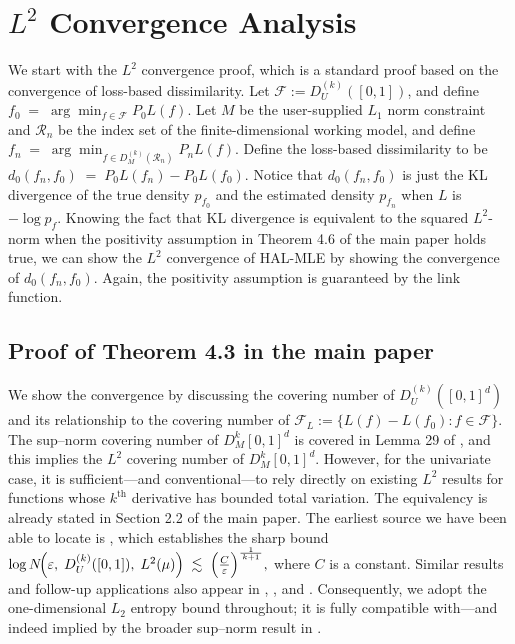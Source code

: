 \section{\texorpdfstring{$L^2$}{L2} Convergence Analysis} \label{appB: $L^2$ Convergence Analysis}
We start with the $L^2$ convergence proof, which is a standard proof based on the convergence of loss-based dissimilarity. Let \(\mathcal F := D^{(k)}_U([0,1])\), and define \(f_{0} \;=\; \arg\min_{f\in\mathcal F} P_{0}L(f)\). Let $M$ be the user-supplied $L_1$ norm constraint and $\mathcal{R}_n$ be the index set of the finite-dimensional working model, and define 
\(f_{n} \;=\; \arg\min_{f\in D^{(k)}_M(\mathcal{R}_n)} P_{n}L(f).\)
Define the loss-based dissimilarity to be
\(d_{0}(f_{n},f_{0}) \;=\; P_{0}L(f_{n}) - P_{0}L(f_{0}).\) Notice that $d_{0}(f_{n},f_{0})$ is just the KL divergence of the true density $p_{f_{0}}$ and the estimated density $p_{f_{n}}$ when $L$ is $-\log p_f$. Knowing the fact that KL divergence is equivalent to the squared $L^2$-norm when the positivity assumption in Theorem 4.6 of the main paper holds true, we can show the $L^2$ convergence of HAL-MLE by showing the convergence of $d_{0}(f_{n},f_{0})$. Again, the positivity assumption is guaranteed by the link function.

\subsection{Proof of Theorem 4.3 in the main paper}
We show the convergence by discussing the covering number of $D^{(k)}_U([0,1]^d)$ and its relationship to the covering number of $\mathcal{F}_L := \{L(f) - L(f_0): f \in \mathcal F\}$.
The sup–norm covering number of $D^k_M[0,1]^d$ is covered in Lemma 29 of \citep{vanderlaan2023higherordersplinehighly}, and this implies the $L^2$ covering number of $D^k_M[0,1]^d$. However, for the univariate case, it is sufficient—and conventional—to rely directly on existing \(L^{2}\) results for functions whose \(k^{\text{th}}\) derivative has bounded total variation. The equivalency is already stated in Section 2.2 of the main paper. The earliest source we have been able to locate is \citep{birman1967piecewise}, which establishes the sharp bound
\(
\log N\!\Bigl(\varepsilon,\; D^{(k)}_U([0,1]),\; L^2(\mu)\Bigr)
\;\lesssim\;
\Bigl(\tfrac{C}{\varepsilon}\Bigr)^{\frac{1}{\,k+1\,}},
\) where $C$ is a constant.
Similar results and follow-up applications also appear in \citep{mammen1997locally}, \citep{tibshirani2014adaptive}, and \citep{sadhanala2019additive}. Consequently, we adopt the one-dimensional \(L_{2}\) entropy bound throughout; it is fully compatible with—and indeed implied by the broader sup–norm result in \citep{vanderlaan2023higherordersplinehighly}.

